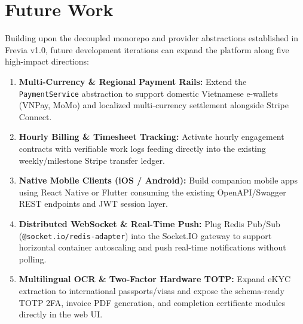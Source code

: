 

\section{Future Work}

Building upon the decoupled monorepo and provider abstractions established in Frevia v1.0, future development iterations can expand the platform along five high-impact directions:

\begin{enumerate}[leftmargin=1.2cm, itemsep=4pt]
    \item \textbf{Multi-Currency \& Regional Payment Rails:} Extend the \texttt{PaymentService} abstraction to support domestic Vietnamese e-wallets (VNPay, MoMo) and localized multi-currency settlement alongside Stripe Connect.
    \item \textbf{Hourly Billing \& Timesheet Tracking:} Activate hourly engagement contracts with verifiable work logs feeding directly into the existing weekly/milestone Stripe transfer ledger.
    \item \textbf{Native Mobile Clients (iOS / Android):} Build companion mobile apps using React Native or Flutter consuming the existing OpenAPI/Swagger REST endpoints and JWT session layer.
    \item \textbf{Distributed WebSocket \& Real-Time Push:} Plug Redis Pub/Sub (\texttt{@socket.io/redis-adapter}) into the Socket.IO gateway to support horizontal container autoscaling and push real-time notifications without polling.
    \item \textbf{Multilingual OCR \& Two-Factor Hardware TOTP:} Expand eKYC extraction to international passports/visas and expose the schema-ready TOTP 2FA, invoice PDF generation, and completion certificate modules directly in the web UI.
\end{enumerate}

